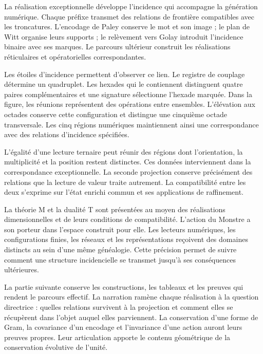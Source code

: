 
La réalisation exceptionnelle développe l’incidence qui accompagne
la génération numérique. Chaque préfixe transmet des relations de frontière
compatibles avec les troncatures. L’encodage de Paley conserve
le mot et son image ; le plan de Witt organise leurs supports ; le
relèvement vers Golay introduit l’incidence binaire avec ses marques.
Le parcours ultérieur construit les réalisations réticulaires et
opératorielles correspondantes.

Les étoiles d'incidence permettent d'observer ce lien. Le registre de couplage détermine un quadruplet. Les hexades qui le contiennent distinguent quatre paires complémentaires et une signature sélectionne l'hexade marquée. Dans la figure, les réunions représentent des opérations entre ensembles. L'élévation aux octades conserve cette configuration et distingue une cinquième octade transversale. Les cinq régions numériques maintiennent ainsi une correspondance avec des relations d'incidence spécifiées.

L’égalité d’une lecture ternaire peut réunir des régions dont
l’orientation, la multiplicité et la position restent distinctes. Ces
données interviennent dans la correspondance exceptionnelle. La seconde
projection conserve précisément des relations que la lecture de valeur
traite autrement. La compatibilité entre les deux s’exprime sur
l’état enrichi commun et ses applications de raffinement.

La théorie M et la dualité T sont présentées au moyen des réalisations
dimensionnelles et de leurs conditions de compatibilité. L’action du
Monstre a son porteur dans l’espace construit pour elle. Les
lecteurs numériques, les configurations finies, les réseaux et les
représentations reçoivent des domaines distincts au sein d’une même
généalogie. Cette précision permet de suivre comment une structure
incidencielle se transmet jusqu’à ses conséquences ultérieures.

La partie suivante conserve les constructions, les tableaux et les preuves
qui rendent le parcours effectif. La narration ramène chaque
réalisation à la question directrice : quelles relations survivent à la
projection et comment elles se récupèrent dans l’objet auquel elles parviennent. La
conservation d’une forme de Gram, la covariance d’un encodage
et l’invariance d’une action auront leurs preuves propres. Leur
articulation apporte le contenu géométrique de la conservation
évolutive de l’unité.

